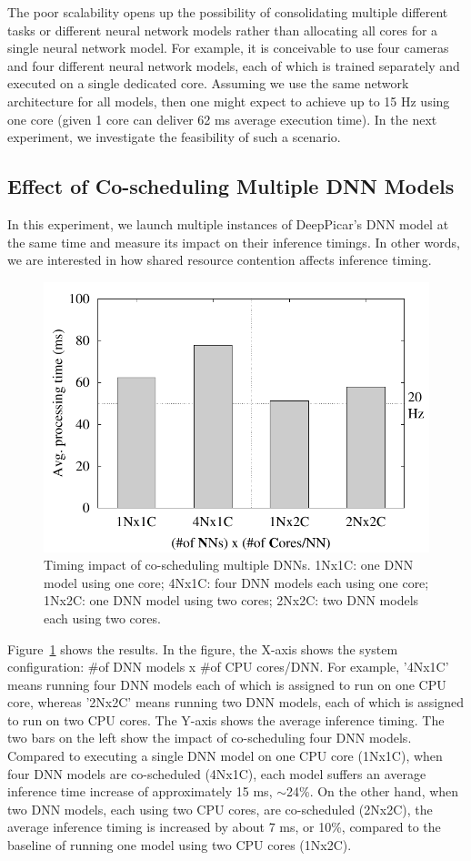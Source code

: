The poor scalability opens up the possibility of consolidating
multiple different tasks or different neural network models rather
than allocating all cores for a single neural network model. For
example, it is conceivable to use four cameras and four different
neural network models, each of which is trained separately and
executed on a single dedicated core. Assuming we use the same network
architecture for all models, then one might expect to achieve up to
15 Hz using one core (given 1 core can deliver 62 ms average
execution time). In the next experiment, we investigate the
feasibility of such a scenario.

\subsection{Effect of Co-scheduling Multiple DNN Models}

In this experiment, we launch multiple instances of DeepPicar's DNN
model at the same time and measure its impact on their inference
timings. In other words, we are interested in how shared resource
contention affects inference timing.

\begin{figure}[h]
  \centering
  \includegraphics[width=.45\textwidth]{figs/perf_vs_modelcnt}
  \caption{Timing impact of co-scheduling multiple DNNs. 1Nx1C: one DNN
    model using one core; 4Nx1C: four DNN models each using one core;
    1Nx2C: one DNN model using two cores; 2Nx2C: two DNN models each
    using two cores.} 
  \label{fig:perf-vs-modelcnt}
\end{figure}

Figure~\ref{fig:perf-vs-modelcnt} shows the results. In the figure, the
X-axis shows the system configuration: \#of DNN models x \#of CPU
cores/DNN. For example, '4Nx1C' means running four DNN models each of
which is assigned to run on one CPU core, whereas '2Nx2C' means running
two DNN models, each of which is assigned to run on two CPU
cores. The Y-axis shows the average inference timing.
The two bars on the left show the impact of co-scheduling four DNN
models. Compared to executing a single DNN model on one CPU core
(1Nx1C), when four DNN models are co-scheduled (4Nx1C), each model
suffers an average inference time increase of approximately 15 ms,
$\sim$24\%. On the other hand, when two DNN models, each using two CPU
cores, are co-scheduled (2Nx2C), the average inference timing is increased by
about 7 ms, or 10\%, compared to the baseline of running one model
using two CPU cores (1Nx2C). 

